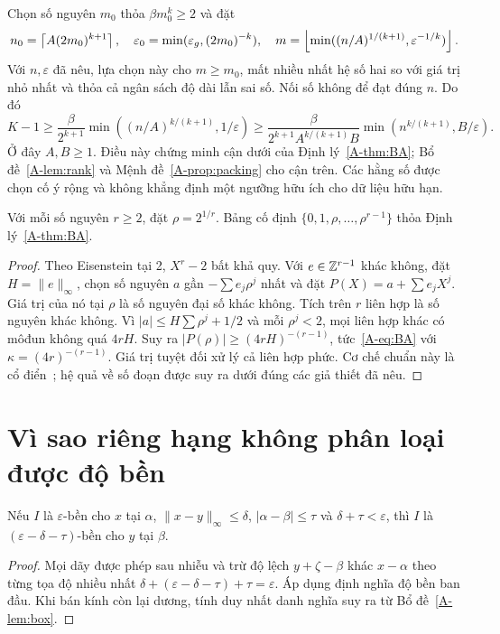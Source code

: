 Chọn số nguyên $m_0$ thỏa $\beta m_0^k\ge2$ và đặt
\begin{equation}\label{A-eq:quantifiers}
n_0=\left\lceil A(2m_0)^{k+1}\right\rceil,\quad
\varepsilon_0=\min(\varepsilon_g,(2m_0)^{-k}),\quad
m=\left\lfloor \min((n/A)^{1/(k+1)},\varepsilon^{-1/k})\right\rfloor.
\end{equation}
Với $n,\varepsilon$ đã nêu, lựa chọn này cho $m\ge m_0$, mất nhiều nhất hệ số hai so với giá trị nhỏ nhất và thỏa cả ngân sách độ dài lẫn sai số. Nối số không để đạt đúng $n$. Do đó
\begin{equation}\label{A-eq:lower}
K-1\ge\frac{\beta}{2^{k+1}}\min((n/A)^{k/(k+1)},1/\varepsilon)
\ge\frac{\beta}{2^{k+1}A^{k/(k+1)}B}\min(n^{k/(k+1)},B/\varepsilon).
\end{equation}
Ở đây $A,B\ge1$. Điều này chứng minh cận dưới của Định lý~\ref{A-thm:BA}; Bổ đề~\ref{A-lem:rank} và Mệnh đề~\ref{A-prop:packing} cho cận trên. Các hằng số được chọn cố ý rộng và không khẳng định một ngưỡng hữu ích cho dữ liệu hữu hạn.

\begin{corollary}\label{A-cor:algebraic}
Với mỗi số nguyên $r\ge2$, đặt $\rho=2^{1/r}$. Bảng cố định $\{0,1,\rho,\ldots,\rho^{r-1}\}$ thỏa Định lý~\ref{A-thm:BA}.
\end{corollary}
\begin{proof}
Theo Eisenstein tại 2, $X^r-2$ bất khả quy. Với $e\in\mathbb Z^{r-1}$ khác không, đặt $H=\|e\|_\infty$, chọn số nguyên $a$ gần $-\sum e_j\rho^j$ nhất và đặt $P(X)=a+\sum e_jX^j$. Giá trị của nó tại $\rho$ là số nguyên đại số khác không. Tích trên $r$ liên hợp là số nguyên khác không. Vì $|a|\le H\sum\rho^j+1/2$ và mỗi $\rho^j<2$, mọi liên hợp khác có môđun không quá $4rH$. Suy ra $|P(\rho)|\ge(4rH)^{-(r-1)}$, tức~\eqref{A-eq:BA} với $\kappa=(4r)^{-(r-1)}$. Giá trị tuyệt đối xử lý cả liên hợp phức. Cơ chế chuẩn này là cổ điển~\cite{fgm}; hệ quả về số đoạn được suy ra dưới đúng các giả thiết đã nêu.
\end{proof}

\section{Vì sao riêng hạng không phân loại được độ bền}
\begin{lemma}\label{A-lem:transfer}
Nếu $I$ là $\varepsilon$-bền cho $x$ tại $\alpha$, $\|x-y\|_\infty\le\delta$, $|\alpha-\beta|\le\tau$ và $\delta+\tau<\varepsilon$, thì $I$ là $(\varepsilon-\delta-\tau)$-bền cho $y$ tại $\beta$.
\end{lemma}
\begin{proof}
Mọi dãy được phép sau nhiễu và trừ độ lệch $y+\zeta-\beta$ khác $x-\alpha$ theo từng tọa độ nhiều nhất $\delta+(\varepsilon-\delta-\tau)+\tau=\varepsilon$. Áp dụng định nghĩa độ bền ban đầu. Khi bán kính còn lại dương, tính duy nhất danh nghĩa suy ra từ Bổ đề~\ref{A-lem:box}.
\end{proof}

